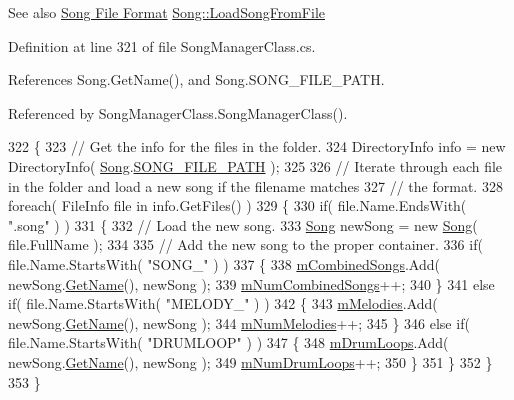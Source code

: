 \begin{DoxySeeAlso}{See also}
\hyperlink{group___song_group_DocSongFileFormat}{Song File Format} \hyperlink{group___song_priv_func_ga5c8edd8f7ebeab0d93f5619a644c30f5}{Song\+::\+Load\+Song\+From\+File} 
\end{DoxySeeAlso}


Definition at line 321 of file Song\+Manager\+Class.\+cs.



References Song.\+Get\+Name(), and Song.\+S\+O\+N\+G\+\_\+\+F\+I\+L\+E\+\_\+\+P\+A\+TH.



Referenced by Song\+Manager\+Class.\+Song\+Manager\+Class().


\begin{DoxyCode}
322     \{
323         \textcolor{comment}{// Get the info for the files in the folder.}
324         DirectoryInfo info = \textcolor{keyword}{new} DirectoryInfo( \hyperlink{class_song}{Song}.\hyperlink{group___song_const_ga95247572cf734f9e8b35973de4eeb1a4}{SONG\_FILE\_PATH} );
325 
326         \textcolor{comment}{// Iterate through each file in the folder and load a new song if the filename matches }
327         \textcolor{comment}{// the format.}
328         \textcolor{keywordflow}{foreach}( FileInfo file \textcolor{keywordflow}{in} info.GetFiles() )
329         \{
330             \textcolor{keywordflow}{if}( file.Name.EndsWith( \textcolor{stringliteral}{".song"} ) )
331             \{
332                 \textcolor{comment}{// Load the new song.}
333                 \hyperlink{class_song}{Song} newSong = \textcolor{keyword}{new} \hyperlink{class_song}{Song}( file.FullName );
334 
335                 \textcolor{comment}{// Add the new song to the proper container.}
336                 \textcolor{keywordflow}{if}( file.Name.StartsWith( \textcolor{stringliteral}{"SONG\_"} ) )
337                 \{
338                     \hyperlink{group___s_m_priv_var_gaf6b4ff41b8da95d10ad3db62df111faa}{mCombinedSongs}.Add( newSong.\hyperlink{group___song_pub_func_ga705c433f2bfb5aede337698144b23c8b}{GetName}(), newSong );
339                     \hyperlink{group___s_m_priv_var_gae423c7b9efd0e2ef721820318200e5f9}{mNumCombinedSongs}++;
340                 \}
341                 \textcolor{keywordflow}{else} \textcolor{keywordflow}{if}( file.Name.StartsWith( \textcolor{stringliteral}{"MELODY\_"} ) )
342                 \{
343                     \hyperlink{group___s_m_priv_var_ga935e80f645d0546003f7df8443b79242}{mMelodies}.Add( newSong.\hyperlink{group___song_pub_func_ga705c433f2bfb5aede337698144b23c8b}{GetName}(), newSong );
344                     \hyperlink{group___s_m_priv_var_ga58ea3b4f794b9e444eece384ae6e8197}{mNumMelodies}++;
345                 \}
346                 \textcolor{keywordflow}{else} \textcolor{keywordflow}{if}( file.Name.StartsWith( \textcolor{stringliteral}{"DRUMLOOP"} ) )
347                 \{
348                     \hyperlink{group___s_m_priv_var_ga84f25335035755448d11acb9287360f2}{mDrumLoops}.Add( newSong.\hyperlink{group___song_pub_func_ga705c433f2bfb5aede337698144b23c8b}{GetName}(), newSong );
349                     \hyperlink{group___s_m_priv_var_ga0ea9b6c8343a9b2cbe0eb375edaef247}{mNumDrumLoops}++;
350                 \}
351             \}
352         \}
353     \}
\end{DoxyCode}
